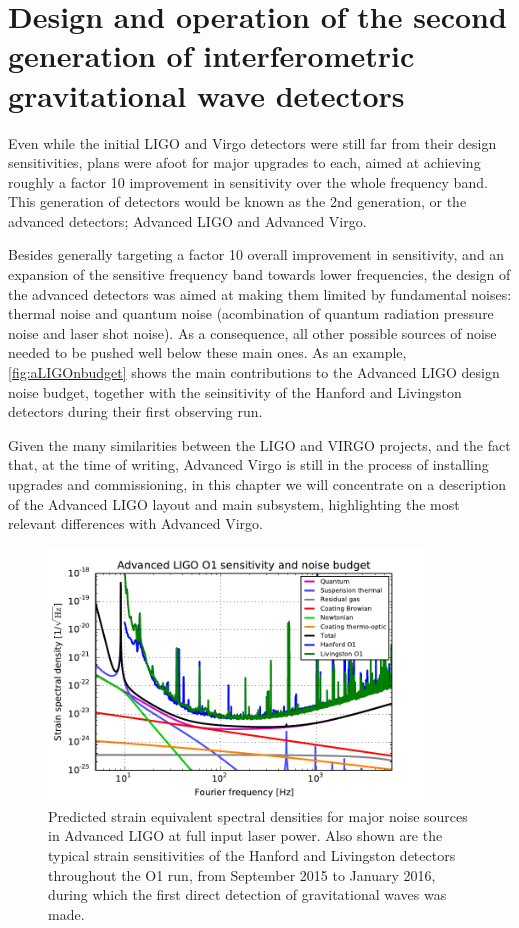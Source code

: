 \section{Design and operation of the second generation of interferometric gravitational wave detectors}\label{subsec:2ndgen}

Even while the initial LIGO and Virgo detectors were still far from their design sensitivities, plans were afoot for major upgrades to each, aimed at achieving roughly a factor 10 improvement in sensitivity over the whole frequency band. 
This generation of detectors would be known as the 2nd generation, or the advanced detectors; Advanced LIGO\cite{Aasi_2015b,aLIGOSensitivity} and Advanced Virgo\cite{aVirgoTR2012}. 

Besides generally targeting a factor 10 overall improvement in sensitivity, and an expansion of the sensitive frequency band towards lower frequencies, the design of the advanced detectors was aimed at making them limited by fundamental noises: thermal noise and quantum noise (acombination of quantum radiation pressure noise and laser shot noise).
As a consequence, all other possible sources of noise needed to be pushed well below these main ones.
As an example, \autoref{fig:aLIGOnbudget} shows the main contributions to the Advanced LIGO design noise budget, together with the seinsitivity of the Hanford and Livingston detectors during their first observing run.

Given the many similarities between the LIGO and VIRGO projects, and the fact that, at the time of writing, Advanced Virgo is still in the process of installing upgrades and commissioning, in this chapter we will concentrate on a description of the Advanced LIGO layout and main subsystem, highlighting the most relevant differences with Advanced Virgo.

\begin{figure}[htb]
	\begin{center}
		\includegraphics[width=0.9\textwidth]{Figures/aLIGOnbudget.pdf}
		\caption{\label{fig:aLIGOnbudget}Predicted strain equivalent spectral densities for major noise sources in Advanced LIGO at full input laser power. Also shown are the typical strain sensitivities of the Hanford and Livingston detectors throughout the O1 run, from September 2015 to January 2016, during which the first direct detection of gravitational waves was made.}
	\end{center}
\end{figure}

